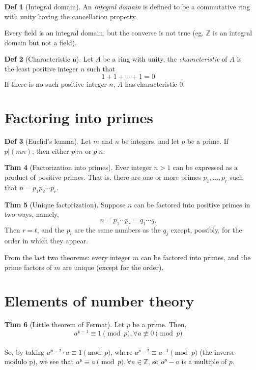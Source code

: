 \documentclass{article}
\theoremstyle{definition}
\newtheorem{definition}{Def}[section]
\newtheorem{theorem}[definition]{Thm}
\begin{document}
\begin{definition}[Integral domain]
    An \emph{integral domain} is defined to be a commutative ring with unity having the cancellation property.
\end{definition}

Every field is an integral domain, but the converse is not true (eg. $\mathbb{Z}$ is an integral domain but not a field).

\begin{definition}[Characteristic n]
    Let $A$ be a ring with unity, the \emph{characteristic} of $A$ is the least positive integer $n$ such that
    $$1 + 1 + \cdots + 1 = 0$$
    If there is no such positive integer $n$, $A$ has characteristic $0$.
\end{definition}

\section{Factoring into primes}

\begin{definition}[Euclid's lemma]
    Let $m$ and $n$ be integers, and let $p$ be a prime. If $p|(mn)$, then either $p|m$ or $p|n$.
\end{definition}

\begin{theorem}[Factorization into primes]
    Ever integer $n>1$ can be expressed as a product of positive primes. That is, there are one or more primes $p_1, \ldots, p_r$ such that $n=p_1 p_2 \cdots p_r$.
\end{theorem}

\begin{theorem}[Unique factorization]
    Suppose $n$ can be factored into positive primes in two ways, namely,
    $$n= p_1 \cdots p_r = q_1 \cdots q_t$$
    Then $r=t$, and the $p_i$ are the same numbers as the $q_j$ except, possibly, for the order in which they appear.
\end{theorem}

From the last two theorems: every integer $m$ can be factored into primes, and the prime factors of $m$ are unique (except for the order).


\section{Elements of number theory}

\begin{theorem}[Little theorem of Fermat]
    Let $p$ be a prime. Then,
    $$a^{p-1} \equiv 1 \pmod p, \forall a \not\equiv 0 \pmod p$$
    \\
    So, by taking $a^{p-2} \cdot a \equiv 1 \pmod p$, where $a^{p-2} \equiv a^{-1} \pmod p$ (the inverse modulo p), we see that $a^p \equiv a \pmod p, \forall a \in \mathbb{Z}$, so $a^p - a$ is a multiple of $p$.
\end{theorem}
\end{document}
